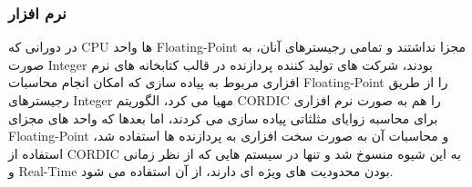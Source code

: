 \documentclass[12pt,titlepage,a4page , tikz , multi,table , svgnames,xcdraw]{article}
\begin{document}
\subsubsection{نرم افزار}

در دورانی که CPU ها واحد Floating-Point مجزا نداشتند و تمامی رجیسترهای آنان، به صورت Integer بودند، شرکت های تولید کننده پردازنده در قالب کتابخانه های نرم افزاری مربوط به پیاده سازی  که امکان انجام محاسبات Floating-Point را از طریق رجیسترهای Integer مهیا می کرد، الگوریتم CORDIC را هم به صورت نرم افزاری برای محاسبه زوایای مثلثاتی پیاده سازی می کردند، اما بعدها که واحد های مجزای Floating-Point و محاسبات آن به صورت سخت افزاری به پردازنده ها استفاده شد، استفاده از CORDIC به این شیوه منسوخ شد و تنها در سیستم هایی که از نظر زمانی و Real-Time بودن محدودیت های ویژه ای دارند، از آن استفاده می شود. \cite{wikipedia}


\newpage

\medskip




\end{document}
